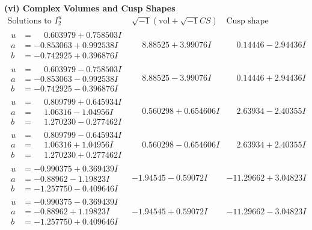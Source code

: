 \documentclass[1p]{elsarticle_modified}
\theoremstyle{definition}
\newcommand{\I}{\sqrt{-1}}
\begin{document}
\newpage\flushleft \textbf{(vi) Complex Volumes and Cusp Shapes}
$$\begin{array}{c|c|c}  
\text{Solutions to }I^u_{2}& \I (\text{vol} + \sqrt{-1}CS) & \text{Cusp shape}\\
 \hline 
\begin{aligned}
u &= \phantom{-}0.603979 + 0.758503 I \\
a &= -0.853063 + 0.992538 I \\
b &= -0.742925 + 0.396876 I\end{aligned}
 & \phantom{-}8.88525 + 3.99076 I & \phantom{-}0.14446 - 2.94436 I \\ \hline\begin{aligned}
u &= \phantom{-}0.603979 - 0.758503 I \\
a &= -0.853063 - 0.992538 I \\
b &= -0.742925 - 0.396876 I\end{aligned}
 & \phantom{-}8.88525 - 3.99076 I & \phantom{-}0.14446 + 2.94436 I \\ \hline\begin{aligned}
u &= \phantom{-}0.809799 + 0.645934 I \\
a &= \phantom{-}1.06316 - 1.04956 I \\
b &= \phantom{-}1.270230 - 0.277462 I\end{aligned}
 & \phantom{-}0.560298 + 0.654606 I & \phantom{-}2.63934 - 2.40355 I \\ \hline\begin{aligned}
u &= \phantom{-}0.809799 - 0.645934 I \\
a &= \phantom{-}1.06316 + 1.04956 I \\
b &= \phantom{-}1.270230 + 0.277462 I\end{aligned}
 & \phantom{-}0.560298 - 0.654606 I & \phantom{-}2.63934 + 2.40355 I \\ \hline\begin{aligned}
u &= -0.990375 + 0.369439 I \\
a &= -0.88962 - 1.19823 I \\
b &= -1.257750 - 0.409646 I\end{aligned}
 & -1.94545 - 0.59072 I & -11.29662 + 3.04823 I \\ \hline\begin{aligned}
u &= -0.990375 - 0.369439 I \\
a &= -0.88962 + 1.19823 I \\
b &= -1.257750 + 0.409646 I\end{aligned}
 & -1.94545 + 0.59072 I & -11.29662 - 3.04823 I \\ \hline\begin{aligned}

\end{aligned}
\end{array}$$
\end{document}
